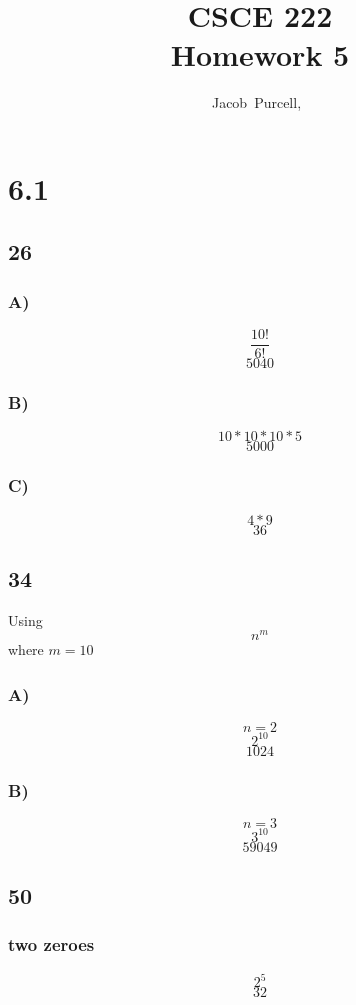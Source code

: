 \documentclass[journal]{IEEEtran}
\begin{document}
\title{CSCE 222 \\ Homework 5}

\author{Jacob~Purcell,~}

\maketitle
\section*{6.1}

\subsection*{26}
\subsubsection*{A)}
$$\frac{10!}{6!}$$
$$\boxed{5040}$$

\subsubsection*{B)}
$$10*10*10*5$$
$$\boxed{5000}$$

\subsubsection*{C)}
$$4*9$$
$$\boxed{36}$$

\subsection*{34}
Using 
$$n^m$$
where $m=10$
\subsubsection*{A)}
$$n = 2$$
$$2^10$$
$$\boxed{1024}$$

\subsubsection*{B)}
$$n = 3$$
$$3^10$$
$$\boxed{59049}$$

\subsection*{50}
\subsubsection*{two zeroes}
$$2^5$$
$$\boxed{32}$$
\end{document}
